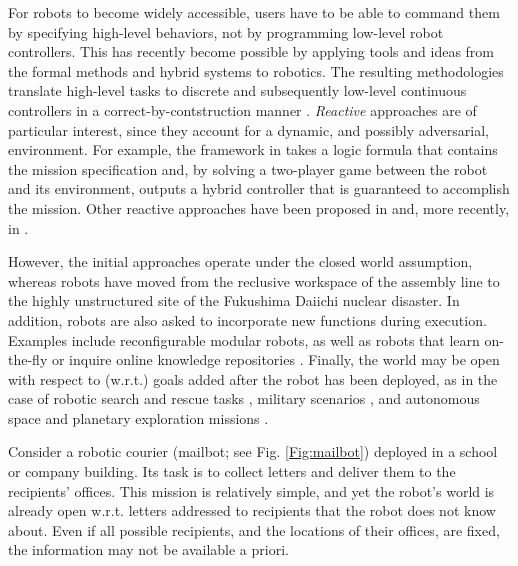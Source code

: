 For robots to become widely accessible, users have to be able to command them by specifying high-level behaviors, not by programming low-level robot controllers.
This has recently become possible by applying tools and ideas from the formal methods and hybrid systems to robotics. The resulting methodologies translate high-level tasks to discrete and subsequently low-level continuous controllers in a correct-by-contstruction manner \cite{BBEFKP06}.
\emph{Reactive} approaches are of particular interest, since they account for a dynamic, and possibly adversarial, environment. For example, the framework in \cite{KGFP_TRO09} takes a logic formula that contains the mission specification and, by solving a two-player game between the robot and its environment, outputs a hybrid controller that is guaranteed to accomplish the mission. Other reactive approaches have been proposed in \cite{Wongpiromsarn2010} and, more recently, in \cite{Belta2013RSS}.

However, the initial approaches operate under the closed world assumption, whereas robots have moved from the reclusive workspace of the assembly line to the highly unstructured site of the Fukushima Daiichi nuclear disaster. 
In addition, robots are also asked to incorporate new functions during execution. 
Examples include reconfigurable modular robots, as well as robots that learn on-the-fly \cite{SaxenaIJRR2012} or inquire online knowledge repositories \cite{rapyuta2013}. 
Finally, the world may be open with respect to (w.r.t.) goals added after the robot has been deployed, as in the case of robotic search and rescue tasks \cite{MatthiasAI2010}, military scenarios \cite{gda2013}, and autonomous space and planetary exploration missions \cite{spaceXplore2006}. 

\begin{myExample}\label{Ex:mailbot1}
Consider a robotic courier (mailbot; see Fig. \ref{Fig:mailbot}) deployed in a school or company building. 
Its task is to collect letters and deliver them to the recipients' offices. 
This mission is relatively simple, and yet the robot's world is already open w.r.t. letters addressed to recipients that the robot does not know about. %
Even if all possible recipients, and the locations of their offices, are fixed, the information may not be available a priori.
\end{myExample}


